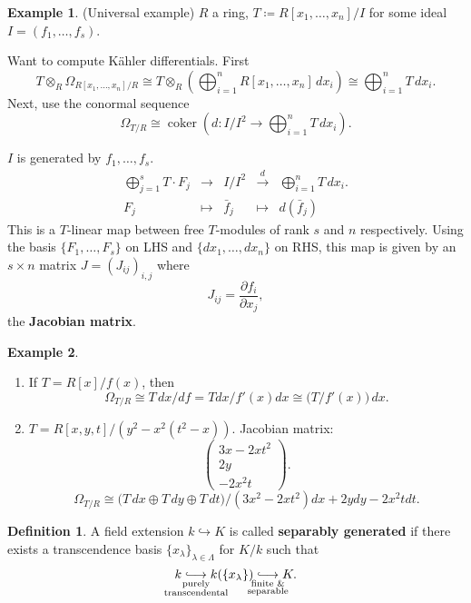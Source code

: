 \documentclass[12pt]{article}
\DeclareMathOperator{\coker}{coker}
\theoremstyle{definition}
\newtheorem*{definition}{Definition}
\newtheorem*{example}{Example}
\begin{document}
\begin{example}
(Universal example) $R$ a ring, $T\coloneqq R[x_1,\ldots,x_n]/I$ for some ideal $I=(f_1,\ldots,f_s)$.

Want to compute K\"{a}hler differentials. First
\[T\otimes_R\Omega_{R[x_1,\ldots,x_n]/R}\cong T\otimes_R\left(\bigoplus_{i=1}^nR[x_1,\ldots,x_n]\,dx_i\right)\cong\bigoplus_{i=1}^nT\,dx_i.\]
Next, use the conormal sequence
\[\Omega_{T/R}\cong\coker\left(d:I/I^2\rightarrow\bigoplus_{i=1}^nT\,dx_i\right).\]

$I$ is generated by $f_1,\ldots,f_s$.
\[
\begin{array}{rcccl}
\displaystyle{\bigoplus_{j=1}^sT\cdot F_j}&\longrightarrow&I/I^2&\overset{d}{\longrightarrow}&\displaystyle{\bigoplus_{i=1}^nT\,dx_i}.\\
F_j&\longmapsto&\bar{f}_j&\longmapsto&d(\bar{f}_j)
\end{array}
\]
This is a $T$-linear map between free $T$-modules of rank $s$ and $n$ respectively. Using the basis $\{F_1,\ldots,F_s\}$ on LHS and $\{dx_1,\ldots,dx_n\}$ on RHS, this map is given by an $s\times n$ matrix $J=(J_{ij})_{i,j}$ where
\[J_{ij}=\frac{\partial f_i}{\partial x_j},\]
the \textbf{Jacobian matrix}.
\end{example}

\begin{example}
\begin{enumerate}[label=\alph*)]
\item If $T=R[x]/f(x)$, then
\[\Omega_{T/R}\cong T\,dx/df=Tdx/f'(x)dx\cong\big(T/f'(x)\big)\,dx.\]
\item $T=R[x,y,t]/(y^2-x^2(t^2-x))$. Jacobian matrix:
\[\left(\begin{matrix}3x-2xt^2\\2y\\-2x^2t\end{matrix}\right).\]
\[\Omega_{T/R}\cong\big(T\,dx\oplus T\,dy\oplus T\,dt\big)/(3x^2-2xt^2)dx+2ydy-2x^2tdt.\]
\end{enumerate}
\end{example}

\begin{definition}
A field extension $k\hookrightarrow K$ is called \textbf{separably generated} if there exists a transcendence basis $\{x_{\lambda}\}_{\lambda\in\Lambda}$ for $K/k$ such that
\[k\underset{\mathclap{\substack{\text{purely}\\\text{transcendental}}}}{\lhook\joinrel\longrightarrow}k(\{x_{\lambda}\})\underset{\mathclap{\substack{\text{finite \&}\\\text{separable}}}}{\lhook\joinrel\longrightarrow}K.\]
\end{definition}
\end{document}
